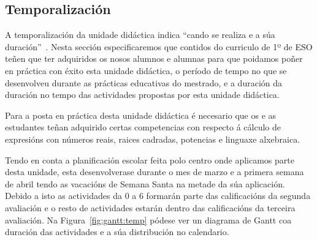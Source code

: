 \subsection{Temporalización}
A temporalización da unidade didáctica indica ``cando se realiza e a súa duración''~\cite{delvalleud}. Nesta sección especificaremos que contidos do curriculo de 1º de ESO teñen que ter adquiridos os nosos alumnos e alumnas para que poidamos poñer en práctica con éxito esta unidade didáctica, o período de tempo no que se desenvolveu durante as prácticas educativas do mestrado, e a duración da duración no tempo das actividades propostas por esta unidade didáctica.

Para a posta en práctica desta unidade didáctica é necesario que os e as estudantes teñan adquirido certas competencias con respecto á cálculo de expresións con números reais, raices cadradas, potencias e linguaxe alxebraica.

Tendo en conta a planificación escolar feita polo centro onde aplicamos parte desta unidade, esta desenvolverase durante o mes de marzo e a primera semana de abril tendo as vacacións de Semana Santa na metade da súa aplicación. Debido a isto as actividades da 0 a 6 formarán parte das calificacións da segunda avaliación e o resto de actividades estarán dentro das calificacións da terceira avaliación. Na Figura~\ref{fig:gantt:temp} pódese ver un diagrama de Gantt coa duración das actividades e a súa distribución no calendario.

